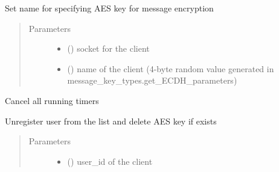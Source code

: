 \documentclass[letterpaper,10pt,english]{sphinxmanual}
\begin{document}
\begin{fulllineitems}
\begin{fulllineitems}
\end{fulllineitems}


\begin{fulllineitems}
\label{\detokenize{bbc1.core.user_message_routing:bbc1.core.user_message_routing.UserMessageRouting.set_aes_name}}
Set name for specifying AES key for message encryption
\begin{quote}\begin{description}
\item[{Parameters}] \leavevmode\begin{itemize}
\item {} 
 () \textendash{} socket for the client

\item {} 
 () \textendash{} name of the client (4-byte random value generated in message\_key\_types.get\_ECDH\_parameters)

\end{itemize}

\end{description}\end{quote}

\end{fulllineitems}


\begin{fulllineitems}
\label{\detokenize{bbc1.core.user_message_routing:bbc1.core.user_message_routing.UserMessageRouting.stop_all_timers}}
Cancel all running timers

\end{fulllineitems}


\begin{fulllineitems}
\label{\detokenize{bbc1.core.user_message_routing:bbc1.core.user_message_routing.UserMessageRouting.unregister_user}}
Unregister user from the list and delete AES key if exists
\begin{quote}\begin{description}
\item[{Parameters}] \leavevmode\begin{itemize}
\item {} 
 () \textendash{} user\_id of the client


\end{itemize}
\end{description}
\end{quote}
\end{fulllineitems}
\end{fulllineitems}
\end{document}
